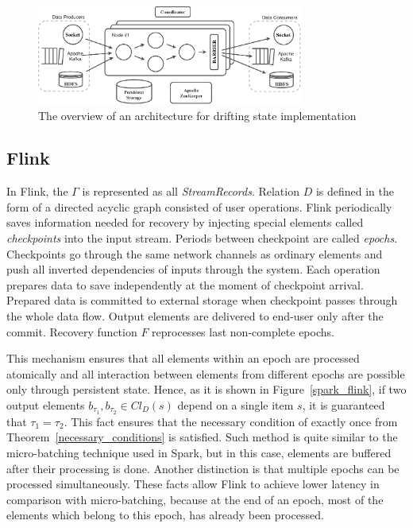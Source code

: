 \begin{figure}[tbp]
  \centering
  \includegraphics[width=0.78\textwidth]{pics/arch}
  \caption{The overview of an architecture for drifting state implementation}
  \label {arch}
\end{figure}
 

\subsection{Flink}

In Flink, the  $\Gamma$ is represented as all {\em StreamRecords}. Relation $D$ is defined in the form of a directed acyclic graph consisted of user operations. Flink periodically saves information needed for recovery by injecting special elements called {\em checkpoints} into the input stream. Periods between checkpoint are called {\em epochs}. Checkpoints go through the same network channels as ordinary elements and push all inverted dependencies of inputs through the system. Each operation prepares data to save independently at the moment of checkpoint arrival. Prepared data is committed to external storage when checkpoint passes through the whole data flow. Output elements are delivered to end-user only after the commit. Recovery function $F$ reprocesses last non-complete epochs.

This mechanism ensures that all elements within an epoch are processed atomically and all interaction between elements from different epochs are possible only through persistent state. Hence, as it is shown in Figure~\ref{spark_flink}, if two output elements $b_{\tau_1},b_{\tau_2} \in Cl_D(s)$ depend on a single item $s$, it is guaranteed that $\tau_1=\tau_2$. This fact ensures that the necessary condition of exactly once from Theorem~\ref{necessary_conditions} is satisfied. Such method is quite similar to the micro-batching technique used in Spark, but in this case, elements are buffered after their processing is done. Another distinction is that multiple epochs can be processed simultaneously. These facts allow Flink to achieve lower latency in comparison with micro-batching, because at the end of an epoch, most of the elements which belong to this epoch, has already been processed.

